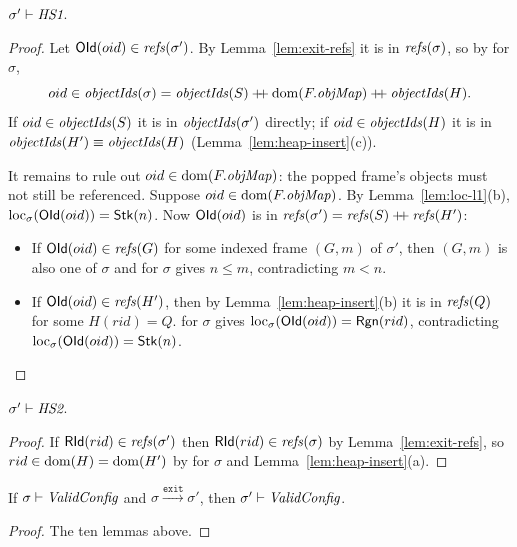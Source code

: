 \begin{lemma}[\inv{HS1}] 
$\sigma' \vdash \textit{HS1}$.
\end{lemma}
\begin{proof}
Let $\mathsf{OId}(oid) \in \mathit{refs}(\sigma')$. By Lemma~\ref{lem:exit-refs} it is in $\mathit{refs}(\sigma)$, so by
 for $\sigma$,
\[ oid \in \mathit{objectIds}(\sigma) = \mathit{objectIds}(S) \mathbin{+\!\!+} \mathrm{dom}(F.\mathit{objMap}) \mathbin{+\!\!+} \mathit{objectIds}(H). \]
If $oid \in \mathit{objectIds}(S)$ it is in $\mathit{objectIds}(\sigma')$ directly; if $oid \in \mathit{objectIds}(H)$ it is in
$\mathit{objectIds}(H') \equiv \mathit{objectIds}(H)$ (Lemma~\ref{lem:heap-insert}(c)).

It remains to rule out $oid \in \mathrm{dom}(F.\mathit{objMap})$: the popped frame's objects must not still be
referenced. Suppose $oid \in \mathrm{dom}(F.\mathit{objMap})$. By Lemma~\ref{lem:loc-l1}(b),
$\mathrm{loc}_{\sigma}(\mathsf{OId}(oid)) = \mathsf{Stk}(n)$. Now $\mathsf{OId}(oid)$ is in $\mathit{refs}(\sigma') = \mathit{refs}(S) \mathbin{+\!\!+} \mathit{refs}(H')$:
\begin{itemize}[nosep]
  \item If $\mathsf{OId}(oid) \in \mathit{refs}(G)$ for some indexed frame $(G, m)$ of $\sigma'$, then $(G, m)$ is also one of $\sigma$ and
     for $\sigma$ gives $n \le m$, contradicting $m < n$.
  \item If $\mathsf{OId}(oid) \in \mathit{refs}(H')$, then by Lemma~\ref{lem:heap-insert}(b) it is in $\mathit{refs}(Q)$
    for some $H(rid) = Q$.  for $\sigma$ gives $\mathrm{loc}_{\sigma}(\mathsf{OId}(oid)) = \mathsf{Rgn}(rid)$,
    contradicting $\mathrm{loc}_{\sigma}(\mathsf{OId}(oid)) = \mathsf{Stk}(n)$. \qedhere
\end{itemize}
\end{proof}

\begin{lemma}[\inv{HS2}] 
$\sigma' \vdash \textit{HS2}$.
\end{lemma}
\begin{proof}
If $\mathsf{RId}(rid) \in \mathit{refs}(\sigma')$ then $\mathsf{RId}(rid) \in \mathit{refs}(\sigma)$ by Lemma~\ref{lem:exit-refs}, so
$rid \in \mathrm{dom}(H) = \mathrm{dom}(H')$ by  for $\sigma$ and Lemma~\ref{lem:heap-insert}(a).
\end{proof}

\begin{theorem} 
If $\sigma \vdash \textit{ValidConfig}$ and $\sigma \xrightarrow{\texttt{exit}} \sigma'$, then
$\sigma' \vdash \textit{ValidConfig}$.
\end{theorem}
\begin{proof}
The ten lemmas above.
\end{proof}

